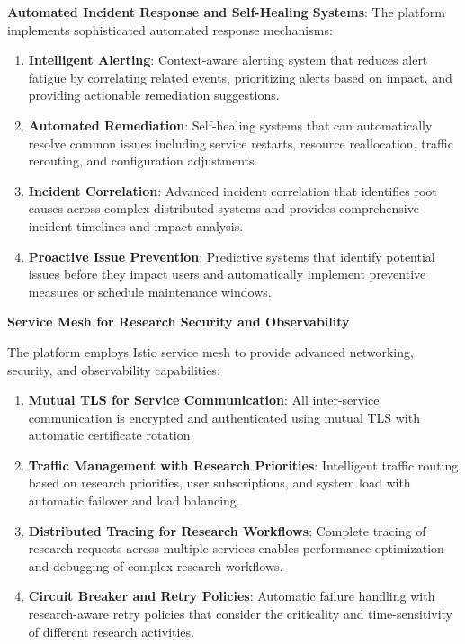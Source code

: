 \documentclass[10pt,twocolumn]{article}
\begin{document}
\textbf{Automated Incident Response and Self-Healing Systems}: The platform implements sophisticated automated response mechanisms:

\begin{enumerate}
    \item \textbf{Intelligent Alerting}: Context-aware alerting system that reduces alert fatigue by correlating related events, prioritizing alerts based on impact, and providing actionable remediation suggestions.
    
    \item \textbf{Automated Remediation}: Self-healing systems that can automatically resolve common issues including service restarts, resource reallocation, traffic rerouting, and configuration adjustments.
    
    \item \textbf{Incident Correlation}: Advanced incident correlation that identifies root causes across complex distributed systems and provides comprehensive incident timelines and impact analysis.
    
    \item \textbf{Proactive Issue Prevention}: Predictive systems that identify potential issues before they impact users and automatically implement preventive measures or schedule maintenance windows.
\end{enumerate}

\textbf{Service Mesh for Research Security and Observability}

The platform employs Istio service mesh to provide advanced networking, security, and observability capabilities:

\begin{enumerate}
    \item \textbf{Mutual TLS for Service Communication}: All inter-service communication is encrypted and authenticated using mutual TLS with automatic certificate rotation.
    
    \item \textbf{Traffic Management with Research Priorities}: Intelligent traffic routing based on research priorities, user subscriptions, and system load with automatic failover and load balancing.
    
    \item \textbf{Distributed Tracing for Research Workflows}: Complete tracing of research requests across multiple services enables performance optimization and debugging of complex research workflows.
    
    \item \textbf{Circuit Breaker and Retry Policies}: Automatic failure handling with research-aware retry policies that consider the criticality and time-sensitivity of different research activities.
\end{enumerate}
\end{document}
